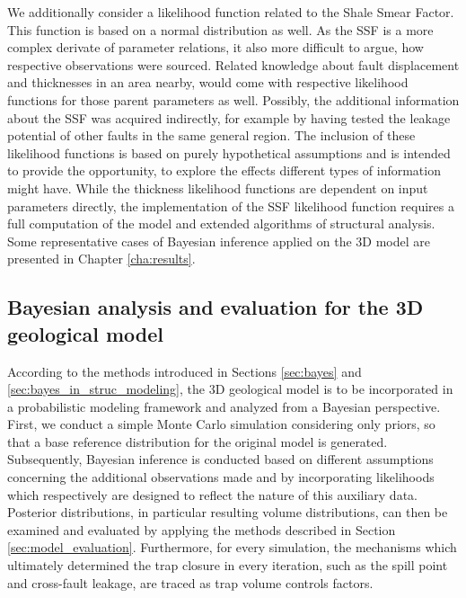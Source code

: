 		We additionally consider a likelihood function related to the Shale Smear Factor. This function is based on a normal distribution as well. As the SSF is a more complex derivate of parameter relations, it also more difficult to argue, how respective observations were sourced. Related knowledge about fault displacement and thicknesses in an area nearby, would come with respective likelihood functions for those parent parameters as well. Possibly, the additional information about the SSF was acquired indirectly, for example by having tested the leakage potential of other faults in the same general region. The inclusion of these likelihood functions is based on purely hypothetical assumptions and is intended to provide the opportunity, to explore the effects different types of information might have. While the thickness likelihood functions are dependent on input parameters directly, the implementation of the SSF likelihood function requires a full computation of the model and extended algorithms of structural analysis.\\
		Some representative cases of Bayesian inference applied on the 3D model are presented in Chapter \ref{cha:results}.
		
		\subsection{Bayesian analysis and evaluation for the 3D geological model}
		According to the methods introduced in Sections \ref{sec:bayes} and \ref{sec:bayes_in_struc_modeling}, the 3D geological model is to be incorporated in a probabilistic modeling framework and analyzed from a Bayesian perspective.
		First, we conduct a simple Monte Carlo simulation considering only priors, so that a base reference distribution for the original model is generated. Subsequently, Bayesian inference is conducted based on different assumptions concerning the additional observations made and by incorporating likelihoods which respectively are designed to reflect the nature of this auxiliary data. Posterior distributions, in particular resulting volume distributions, can then be examined and evaluated by applying the methods described in Section \ref{sec:model_evaluation}. Furthermore, for every simulation, the mechanisms which ultimately determined the trap closure in every iteration, such as the spill point and cross-fault leakage, are traced as trap volume controls factors. 